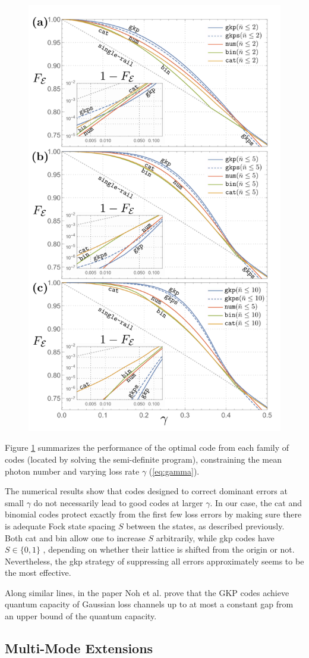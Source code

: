 \documentclass[12]{amsart}
\newcommand\0{\mathbf{0}}
\newcommand\<{\langle}
\renewcommand\>{\rangle}
\begin{document}
\begin{figure}[H]
\label{fig:perf}
\centering
\includegraphics[width=0.5\linewidth,keepaspectratio]{fidelity.png}	
\end{figure}

Figure \ref{fig:perf} summarizes the performance of the optimal code from each family of codes (located by solving the semi-definite program), constraining the mean photon number and varying loss rate $\gamma$ (\ref{eq:gamma}).

The numerical results show that codes designed to correct dominant errors at small $\gamma$ do not necessarily lead to good codes at larger $\gamma$. In our case, the cat and binomial codes protect exactly from the first few loss errors by making sure there is adequate Fock state spacing $S$ between the states, as described previously. Both cat and bin allow one to increase $S$ arbitrarily, while gkp codes have $S \in \{0, 1\}$ \cite{albert2017performance}, depending on whether their lattice is shifted from the origin or not. Nevertheless, the gkp strategy of suppressing all errors approximately seems to be the most effective.

Along similar lines, in the paper \cite{noh2018improved} Noh et al. prove that the GKP codes achieve quantum capacity of Gaussian loss channels up to at most a constant gap from an upper bound of the quantum capacity.

\subsection{Multi-Mode Extensions}
\end{document}
